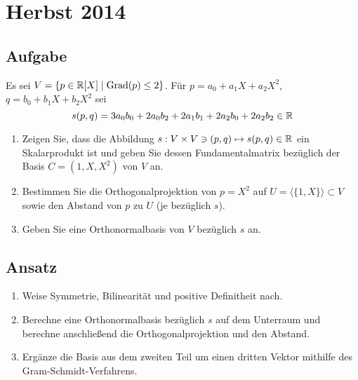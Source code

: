 \newpage

\section{Herbst 2014}

\subsection{Aufgabe}
Es sei \( V = \{ p \in \mathbb{R}[X] \mid \text{Grad}(p) \leq 2 \} \). Für \( p = a_0+a_1X+a_2X^2 \), \( q = b_0+b_1X+b_2X^2 \) sei
\begin{equation*}
	s(p,q) = 3a_0b_0+2a_0b_2+2a_1b_1+2a_2b_0+2a_2b_2 \in \mathbb{R}
\end{equation*}
\begin{enumerate}
	\item Zeigen Sie, dass die Abbildung \( s: V \times V \ni (p,q) \mapsto s(p,q) \in \mathbb{R} \) ein Skalarprodukt ist und geben Sie dessen Fundamentalmatrix bezüglich der Basis \( C=(1,X,X^2) \) von \( V \) an.
	\item Bestimmen Sie die Orthogonalprojektion von \( p=X^2 \) auf \( U = \langle \{ 1,X \} \rangle \subset V \) sowie den Abstand von \( p \) zu \( U \) (je bezüglich \( s \)). 
	\item Geben Sie eine Orthonormalbasis von \( V \) bezüglich \( s \) an.
\end{enumerate}

\subsection{Ansatz}
\begin{enumerate}
	\item Weise Symmetrie, Bilinearität und positive Definitheit nach.
	\item Berechne eine Orthonormalbasis bezüglich \( s \) auf dem Unterraum und berechne anschließend die Orthogonalprojektion und den Abstand.
	\item Ergänze die Basis aus dem zweiten Teil um einen dritten Vektor mithilfe des Gram-Schmidt-Verfahrens.
\end{enumerate}

